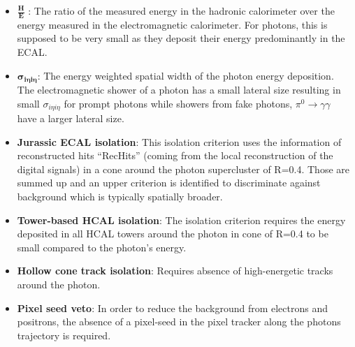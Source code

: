 \begin{itemize}
 \item $\frac{\textbf{H}}{\textbf{E}}$ : The ratio of the measured energy in the hadronic calorimeter over the energy measured in the electromagnetic calorimeter. 
                                                    For photons, this is supposed to be very small as they deposit their energy predominantly in the ECAL.
 \item $\mathbold{\sigma_{i\eta i \eta}}$: The energy weighted spatial width of the photon energy deposition. The electromagnetic shower of a photon has a small lateral size 
                                           resulting in small $\sigma_{i\eta i \eta}$ for prompt photons while showers from fake photons, \eg $\pi^{0} \rightarrow \gamma \gamma$
                                           have a larger lateral size.
 \item \textbf{Jurassic ECAL isolation}: This isolation criterion uses the information of reconstructed hits ``RecHits'' (coming from the local reconstruction of the digital signals) 
                                         in a cone around the photon supercluster of R=0.4. Those are summed up and an upper criterion is identified to discriminate against 
                                         background which is typically spatially broader.  
 \item \textbf{Tower-based HCAL isolation}: The isolation criterion requires the energy deposited in all HCAL towers around the photon in cone of R=0.4 to be small compared to the 
                                            photon's energy. 
 \item \textbf{Hollow cone track isolation}: Requires absence of high-energetic tracks around the photon.
 \item \textbf{Pixel seed veto}: In order to reduce the background from electrons and positrons, the absence of a pixel-seed in the pixel tracker along the photons 
                                 trajectory is required.
\end{itemize}

